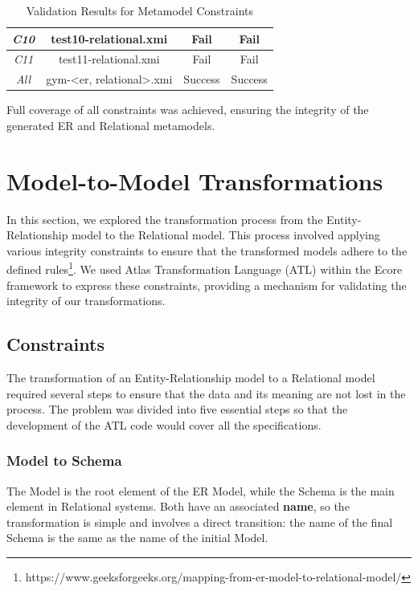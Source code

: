 \documentclass[10pt]{article}
\begin{document}
\begin{table}[H]
\begin{tabular}{|c|c|c|c| }
\textit{C10}         & test10-relational.xmi                                & Fail                     & Fail                     \\ \hline
\textit{C11}         & test11-relational.xmi                                & Fail                     & Fail                     \\ \hline
\textit{All}         & gym-\textless{}er, relational\textgreater{}.xmi     & Success                  & Success                  \\ \hline
\end{tabular}
\caption{Validation Results for Metamodel Constraints}
\label{constraints-validation}
\end{table}

Full coverage of all constraints was achieved, ensuring the integrity of the generated ER and Relational metamodels.

\section{Model-to-Model Transformations}

In this section, we explored the transformation process from the Entity-Relationship model to the Relational model. This process involved applying various integrity constraints to ensure that the transformed models adhere to the defined rules\footnote{https://www.geeksforgeeks.org/mapping-from-er-model-to-relational-model/}. We used Atlas Transformation Language (ATL) within the Ecore framework to express these constraints, providing a mechanism for validating the integrity of our transformations.

\subsection{Constraints}

The transformation of an Entity-Relationship model to a Relational model required several steps to ensure that the data and its meaning are not lost in the process. The problem was divided into five essential steps so that the development of the ATL code would cover all the specifications.

\subsubsection{Model to Schema}

The Model is the root element of the ER Model, while the Schema is the main element in Relational systems. Both have an associated \textbf{name}, so the transformation is simple and involves a direct transition: the name of the final Schema is the same as the name of the initial Model.
\end{document}
